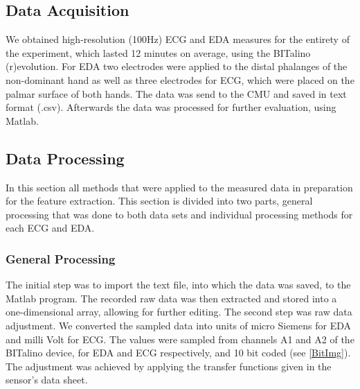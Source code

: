%

\subsection{Data Acquisition}
We obtained high-resolution (100Hz) ECG and EDA measures for the entirety of the experiment, which lasted 12 minutes on average, using the BITalino (r)evolution. For EDA two electrodes were applied to the distal phalanges of the non-dominant hand as well as three electrodes for ECG, which were placed on the palmar surface of both hands. The data was send to the CMU and saved in text format (.csv). Afterwards the data was processed for further evaluation, using Matlab.

\subsection{Data Processing}
In this section all methods that were applied to the measured data in preparation for the feature extraction. This section is divided into two parts, general processing that was done to both data sets and individual processing methods for each ECG and EDA.

\subsubsection{General Processing}
The initial step was to import the text file, into which the data was saved, to the Matlab program. The recorded raw data was then extracted and stored into a one-dimensional array, allowing for further editing.
The second step was raw data adjustment. We converted the sampled data into units of micro Siemens for EDA and milli Volt for ECG. The values were sampled from channels A1 and A2 of the BITalino device, for EDA and ECG respectively, and 10 bit coded (see \ref{BitImg}).
The adjustment was achieved by applying the transfer functions given in the sensor's data sheet.

